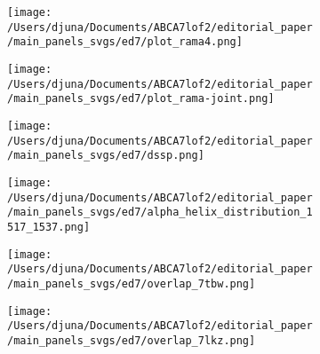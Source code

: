 \documentclass[12pt]{article}
\begin{document}
\begin{figure}[H]
    \begin{subfigure}[t]{.6\textwidth}
        \caption{}
        \texttt{[image: /Users/djuna/Documents/ABCA7lof2/editorial\_paper/main\_panels\_svgs/ed7/plot\_rama4.png]}        
    \end{subfigure}
    \begin{subfigure}[t]{.4\textwidth}
        \caption{}
        \texttt{[image: /Users/djuna/Documents/ABCA7lof2/editorial\_paper/main\_panels\_svgs/ed7/plot\_rama-joint.png]}        
    \end{subfigure}
    \begin{subfigure}[t]{.5\textwidth}
        \caption{}
        \texttt{[image: /Users/djuna/Documents/ABCA7lof2/editorial\_paper/main\_panels\_svgs/ed7/dssp.png]}        
    \end{subfigure}
    \begin{subfigure}[t]{.45\textwidth}
        \caption{}
        \texttt{[image: /Users/djuna/Documents/ABCA7lof2/editorial\_paper/main\_panels\_svgs/ed7/alpha\_helix\_distribution\_1517\_1537.png]}        
    \end{subfigure}
    \begin{subfigure}[t]{.45\textwidth}
        \caption{}
        \texttt{[image: /Users/djuna/Documents/ABCA7lof2/editorial\_paper/main\_panels\_svgs/ed7/overlap\_7tbw.png]}        
    \end{subfigure}
    \begin{subfigure}[t]{.45\textwidth}
        \caption{}
        \texttt{[image: /Users/djuna/Documents/ABCA7lof2/editorial\_paper/main\_panels\_svgs/ed7/overlap\_7lkz.png]}        
    \end{subfigure}
    \end{figure}
\end{document}
